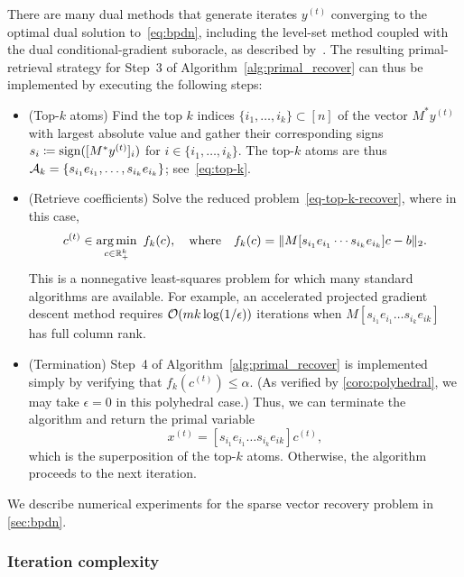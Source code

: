 \begin{example}
  There are many dual methods that generate iterates $y^{(t)}$ converging to the optimal dual solution to~\eqref{eq:bpdn}, including the level-set method coupled with the dual conditional-gradient suboracle, as described by~\cite{aravkin2016levelset,fan2019alignment}. The resulting primal-retrieval strategy for Step~3 of Algorithm~\ref{alg:primal_recover} can thus be implemented by executing the following steps:
  \begin{itemize}
      \item (Top-$k$ atoms) Find the top $k$ indices $\{i_1, \dots, i_k\} \subset [n]$ of the vector $M^*y^{(t)}$ with largest absolute value and gather their corresponding signs $s_i \coloneqq \operatorname{sign}([M^*y^{(t)}]_i)$ for $i \in \{i_1, \dots, i_k\}$. The top-$k$ atoms are thus $\mathcal{A}_k=\{s_{i_1}e_{i_1},\ldots,s_{i_k}e_{i_k}\}$; see~\eqref{eq:top-k}.
      \item (Retrieve coefficients) Solve the reduced problem~\eqref{eq-top-k-recover}, where in this case,
      \begin{equation} \label{eq:bpdn_pr}
          c^{(t)} \in \underset{c \in \mathbb{R}_+^k}{\textrm{arg}\,{\min}}\enskip f_k(c),
          \hbox{\quad where\quad} f_k(c) = \|M[s_{i_1}e_{i_1} \cdots s_{i_k}e_{i_k}]c - b\|_2.
      \end{equation}
      This is a nonnegative least-squares problem for which many standard algorithms are available. For example, an accelerated projected gradient descent method requires $\mathcal{O}( m k \log(1/\epsilon) )$ iterations when $M[s_{i_1}e_{i_1} \dots s_{i_k}e_{ik}]$ has full column rank. 
      \item (Termination) Step~4 of Algorithm~\ref{alg:primal_recover} is implemented simply by verifying that $f_k(c^{(t)}) \leq \alpha$. (As verified by \autoref{coro:polyhedral}, we may take $\epsilon=0$ in this polyhedral case.) Thus, we can terminate the algorithm and return the primal variable 
      \[x^{(t)} = [s_{i_1}e_{i_1} \dots s_{i_k}e_{ik}]c^{(t)},\]
      which is the superposition of the top-$k$ atoms.  Otherwise, the algorithm proceeds to the next iteration. 
  \end{itemize}
  We describe numerical experiments for the sparse vector recovery problem in \autoref{sec:bpdn}. 
\end{example}

\subsubsection{Iteration complexity}\label{sec-iteration-complexity}

